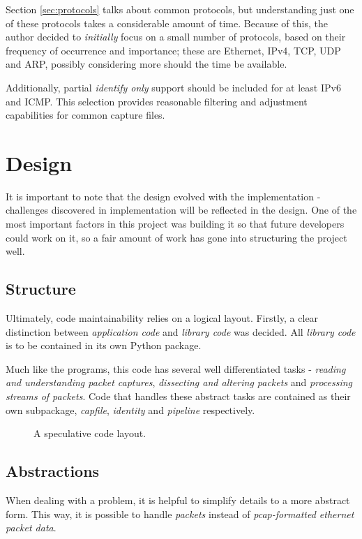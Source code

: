 \documentclass[10pt,a4paper,notitlepage]{report}
\begin{document}
Section \ref{sec:protocols} talks about common protocols, but understanding just one of these protocols takes a considerable amount of time. Because of this, the author decided to \emph{initially} focus on a small number of protocols, based on their frequency of occurrence and importance; these are Ethernet, IPv4, TCP, UDP and ARP, possibly considering more should the time be available.

Additionally, partial \emph{identify only} support should be included for at least IPv6 and ICMP. This selection provides reasonable filtering and adjustment capabilities for common capture files.

\chapter{Design}
It is important to note that the design evolved with the implementation - challenges discovered in implementation will be reflected in the design. One of the most important factors in this project was building it so that future developers could work on it, so a fair amount of work has gone into structuring the project well.

\section{Structure}
Ultimately, code maintainability relies on a logical layout. Firstly, a clear distinction between \emph{application code} and \emph{library code} was decided. All \emph{library code} is to be contained in its own Python package.

Much like the programs, this code has several well differentiated tasks - \emph{reading and understanding packet captures}, \emph{dissecting and altering packets} and \emph{processing streams of packets}. Code that handles these abstract tasks are contained as their own subpackage, \emph{capfile}, \emph{identity} and \emph{pipeline} respectively.

\begin{figure}[H]
\caption{A speculative code layout.}
\label{fig:codelayout}
\end{figure}
\section{Abstractions}
When dealing with a problem, it is helpful to simplify details to a more abstract form. This way, it is possible to handle \emph{packets} instead of \emph{pcap-formatted ethernet packet data}.
\end{document}
